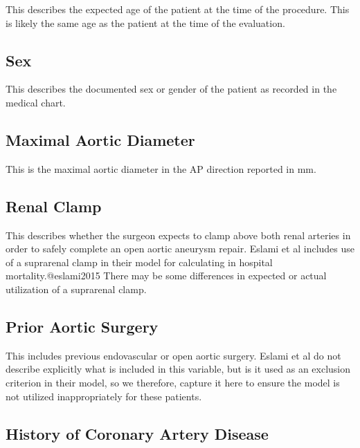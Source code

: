 \documentclass[
]{book}
\begin{document}
This describes the expected age of the patient at the time of the procedure. This is likely the same age as the patient at the time of the evaluation.

\hypertarget{sex}{%
\subsection{Sex}\label{sex}}

This describes the documented sex or gender of the patient as recorded in the medical chart.

\hypertarget{maximal-aortic-diameter}{%
\subsection{Maximal Aortic Diameter}\label{maximal-aortic-diameter}}

This is the maximal aortic diameter in the AP direction reported in mm.

\hypertarget{renal-clamp}{%
\subsection{Renal Clamp}\label{renal-clamp}}

This describes whether the surgeon expects to clamp above both renal arteries in order to safely complete an open aortic aneurysm repair. Eslami et al includes use of a suprarenal clamp in their model for calculating in hospital mortality.@eslami2015 There may be some differences in expected or actual utilization of a suprarenal clamp.

\hypertarget{prior-aortic-surgery}{%
\subsection{Prior Aortic Surgery}\label{prior-aortic-surgery}}

This includes previous endovascular or open aortic surgery. Eslami et al do not describe explicitly what is included in this variable, but is it used as an exclusion criterion in their model, so we therefore, capture it here to ensure the model is not utilized inappropriately for these patients. \citet{eslami2015}

\hypertarget{history-of-coronary-artery-disease}{%
\subsection{History of Coronary Artery Disease}\label{history-of-coronary-artery-disease}}
\end{document}
